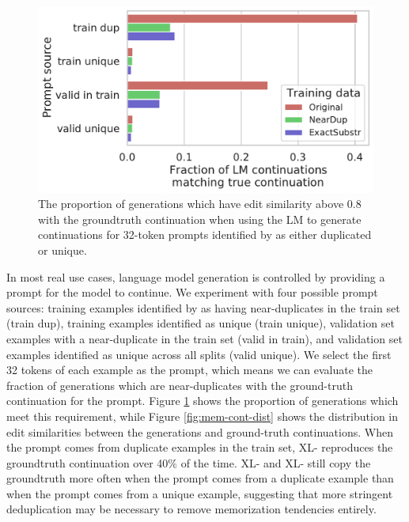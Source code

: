 \begin{figure}[h]
    \centering
    \small
    \includegraphics[width=0.6\linewidth]{figures/memorized_continuations_fraction}
    \caption{The proportion of generations which have edit similarity above 0.8 with the groundtruth continuation when using the LM to generate continuations for 32-token prompts identified by \Approx{} as either duplicated or unique.}
    \label{fig:ground-truth-continuation}
\end{figure}

In most real use cases, language model generation is controlled by providing a prompt for the model to continue.
We experiment with four possible prompt sources: training examples identified by \Exact{} as having near-duplicates in the train set (train dup), training examples identified as unique (train unique), validation set examples with a near-duplicate in the train set (valid in train), and validation set examples identified as unique across all splits (valid unique).
We select the first 32 tokens of each example as the prompt, which means we can evaluate the fraction of generations which are near-duplicates with the ground-truth continuation for the prompt.
Figure \ref{fig:ground-truth-continuation} shows the proportion of generations which meet this requirement, while Figure \ref{fig:mem-cont-dist} shows the distribution in edit similarities between the generations and ground-truth continuations.
When the prompt comes from duplicate examples in the train set, XL-\Original{} reproduces the groundtruth continuation over 40\% of the time.
XL-\Exact{} and XL-\Approx{} still copy the groundtruth more often when the prompt comes from a duplicate example than when the prompt comes from a unique example, suggesting that more stringent deduplication may be necessary to remove memorization tendencies entirely. 




